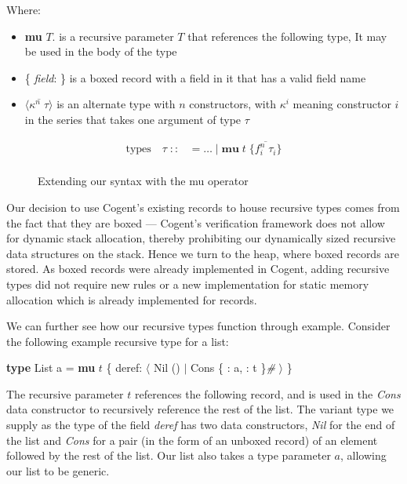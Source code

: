 Where:
\begin{itemize}
   \item
        \textbf{mu} $T$. is a recursive parameter $T$ that references the following type,
        It may be used in the body of the type
    \item
        \{ \textit{field}: \} is a boxed record with a field in it that has a valid field name
    \item 
        $\langle \overline{\kappa^n\; \tau} \rangle$ is an alternate type with $n$ constructors, 
        with $\kappa^i$ meaning constructor $i$ in the series that takes one argument of type $\tau$
\end{itemize}

\FloatBarrier

\begin{figure}
    \centering
    \begin{align*}
        \text{types}\quad \tau\;
            ::&= \dots\; |\; \textbf{mu}\; t\; \{ \overline{f_i^n\; \tau_i} \} \\
    \end{align*}
    \caption{Extending our syntax with the mu operator}
    \label{fig:mu}
\end{figure}

Our decision to use Cogent's existing records to house recursive types comes from the fact that they are boxed ---
Cogent's verification framework does not allow for dynamic stack allocation, thereby prohibiting
our dynamically sized recursive data structures on the stack. Hence we turn to the heap,
where boxed records are stored. As boxed records were already implemented in Cogent, adding recursive
types did not require new rules or a new implementation for static memory allocation which
is already implemented for records. 

We can further see how our recursive types function through example. Consider the following example recursive type for a list:
\begin{center}
    \textbf{type} List a = \textbf{mu} $t$ \{ deref: $\langle$ Nil () $\vert$ Cons \{ : a, : t \}\textit{\#} $\rangle$ \}
\end{center}

The recursive parameter $t$ references the following record, and is used in the \textit{Cons} data constructor
to recursively reference the rest of the list.
The variant type 
we supply as the type of the field
\textit{deref} has two data constructors, \textit{Nil} for the end of the list and \textit{Cons} for a pair
(in the form of an unboxed record) of an element followed by the rest of the list.
Our list also takes a type parameter $a$, allowing our list to be generic.

